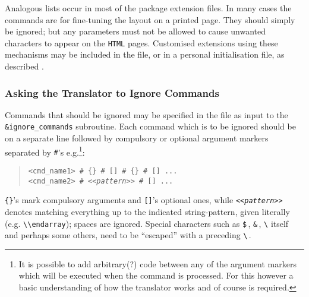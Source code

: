 Analogous lists occur in most of the package extension files.
In many cases the commands are for fine-tuning the layout on
a printed page. They should simply be ignored; but any parameters
must not be allowed to cause unwanted characters to appear on
the \texttt{HTML} pages.
Customised extensions using these mechanisms may be included in the
 file, or in a personal
 initialisation file,
as described .



\subsubsection{Asking the Translator to Ignore Commands\label{ignore}}
\html{\\}%
Commands that should be ignored may be specified in the 
file as input to the \verb|&ignore_commands| subroutine.
Each command which is to be ignored should be on a separate line
followed by compulsory or optional argument markers separated by
{\verb|#|}'s e.g.\footnote{It is possible to add arbitrary(?) \Perl{} code
between any of the argument markers which will be executed when
the command is processed. For this however a basic understanding of
how the translator works and of course \Perl{} is required.}:
\begin{quote}
\begin{small}
\verb|<cmd_name1> # {} # [] # {} # [] ...|\\
\verb|<cmd_name2> # |\texttt{<<\emph{pattern}>>}\verb| # [] ...|
\end{small}
\end{quote}
\verb|{}|'s mark compulsory arguments and \verb|[]|'s optional ones,
while \texttt{<<\emph{pattern}>>} denotes matching everything up to the
indicated string-pattern, given literally (e.g. \verb|\\endarray|);
spaces are ignored. Special characters
such as \verb|$|\,, \verb|&|\,, \verb|\| itself and perhaps some others,
need to be ``escaped'' with a preceding \verb|\|\,.


\html{\\}%

